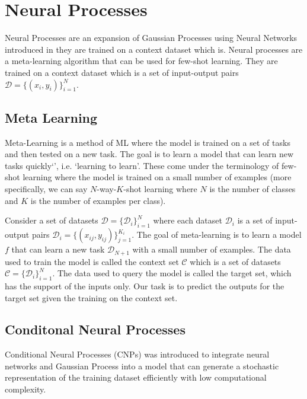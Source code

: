 \documentclass[main.tex]{subfiles}
\begin{document}
\section{Neural Processes}

Neural Processes are an expansion of Gaussian Processes using Neural Networks introduced in \cite{garnelo2018neural} they are trained on a context dataset which is. Neural processes are a meta-learning algorithm that can be used for few-shot learning. They are trained on a context dataset which is a set of input-output pairs $\mathcal{D} = \{ (x_i, y_i) \}_{i=1}^N$. 

\subsection{Meta Learning}

Meta-Learning is a method of ML where the model is trained on a set of tasks and then tested on a new task. The goal is to learn a model that can learn new tasks quickly`', i.e. `learning to learn'. These come under the terminology of few-shot learning where the model is trained on a small number of examples (more specifically, we can say $N$-way-$K$-shot learning where $N$ is the number of classes and $K$ is the number of examples per class).

Consider a set of datasets $\mathcal{D} = \{ \mathcal{D}_i \}_{i=1}^N$ where each dataset $\mathcal{D}_i$ is a set of input-output pairs $\mathcal{D}_i = \{ (x_{ij}, y_{ij}) \}_{j=1}^{K_i}$. The goal of meta-learning is to learn a model $f$ that can learn a new task $\mathcal{D}_{N+1}$ with a small number of examples. The data used to train the model is called the context set $\mathcal{C}$ which is a set of datasets $\mathcal{C} = \{ \mathcal{D}_i \}_{i=1}^N$. The data used to query the model is called the target set, which has the support of the inputs only. Our task is to predict the outputs for the target set given the training on the context set.

\subsection{Conditonal Neural Processes}

Conditional Neural Processes (CNPs) \cite{garnelo2018conditional} was introduced to integrate neural networks and Gaussian Process into a model that can generate a stochastic representation of the training dataset efficiently with low computational complexity. 
\end{document}
